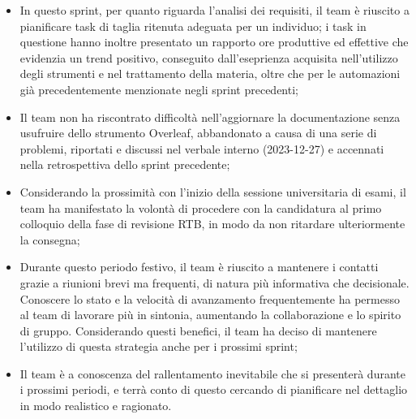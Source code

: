\documentclass[10pt, a4paper]{article}
\begin{document}
{{{{{{{{{{{{{{{\begin{itemize}
    che tenesse conto di tali festività, il team è riuscito a portare a termine i task assegnati all'inizio dello sprint;
    \item In questo sprint, per quanto riguarda l'analisi dei requisiti, il team è riuscito a pianificare task di taglia ritenuta adeguata per un individuo; i task in questione hanno inoltre 
    presentato un rapporto ore produttive ed effettive che evidenzia un trend positivo, conseguito dall'eseprienza acquisita nell'utilizzo degli strumenti e nel trattamento della materia, oltre
    che per le automazioni già precedentemente menzionate negli sprint precedenti; 
    \item Il team non ha riscontrato difficoltà nell'aggiornare la documentazione senza usufruire dello strumento Overleaf, abbandonato a causa di una serie di problemi, riportati e 
    discussi nel verbale interno (2023-12-27) e accennati nella retrospettiva dello sprint precedente;
    \item Considerando la prossimità con l'inizio della sessione universitaria di esami, il team ha manifestato la volontà di procedere con la candidatura al primo colloquio della fase di revisione RTB, in modo da non ritardare ulteriormente la consegna;
    \item Durante questo periodo festivo, il team è riuscito a mantenere i contatti grazie a riunioni brevi ma frequenti, di natura più informativa che decisionale. Conoscere lo stato e la velocità di avanzamento frequentemente ha permesso al team di 
    lavorare più in sintonia, aumentando la collaborazione e lo spirito di gruppo. Considerando questi benefici, il team ha deciso di mantenere l'utilizzo di questa strategia anche per i prossimi sprint;
    \item Il team è a conoscenza del rallentamento inevitabile che si presenterà durante i prossimi periodi, e terrà conto di questo cercando di pianificare nel dettaglio in modo realistico e ragionato. 
\end{itemize}

}}}}}}}}}}}}}}}
\end{document}
